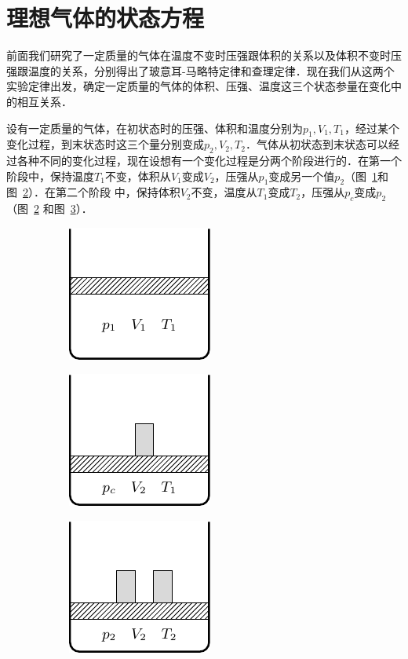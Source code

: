 \section{理想气体的状态方程}
前面我们研究了一定质量的气体在温度不变时压强跟体积的关系以及体积不变时压强跟温度的关系，分别得出了玻意耳-马略特定律和查理定律．现在我们从这两个实验定律出发，确定一定质量的气体的体积、压强、温度这三个状态参量在变化中的相互关系．

设有一定质量的气体，在初状态时的压强、体积和温度分别为$p_1,V_1,T_1$，经过某个变化过程，到末状态时这三个量分别变成$p_2,V_2,T_2$．气体从初状态到末状态可以经过各种不同的变化过程，现在设想有一个变化过程是分两个阶段进行的．在第一个阶段中，保持温度$T_1$不变，体积从$V_1$变成$V_2$，压强从$p_1$变成另一个值$p_2$（图~\ref{fig_B_3-12a}和图~\ref{fig_B_3-12b}）．在第二个阶段
中，保持体积$V_2$不变，温度从$T_1$变成$T_2$，压强从$p_c$变成$p_2$（图~\ref{fig_B_3-12b} 和图~\ref{fig_B_3-12c}）．

\begin{figure}[htbp]
    \centering
    \begin{subfigure}{0.3\linewidth}
        \centering
        \includegraphics{fig/B/3-12a.pdf}
        \caption{}\label{fig_B_3-12a}
    \end{subfigure}
    \hfil
    \begin{subfigure}{0.3\linewidth}
        \centering
        \includegraphics{fig/B/3-12b.pdf}
        \caption{}\label{fig_B_3-12b}
    \end{subfigure}
    \hfil
    \begin{subfigure}{0.3\linewidth}
        \centering
        \includegraphics{fig/B/3-12c.pdf}
        \caption{}\label{fig_B_3-12c}
    \end{subfigure}
    \caption{}\label{fig_B_3-12}
\end{figure}

